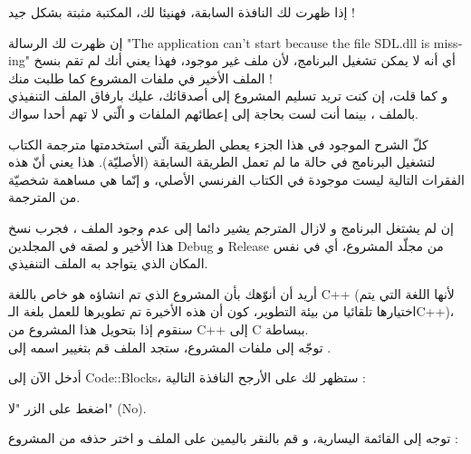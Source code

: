 
إذا ظهرت لك النافذة السابقة، فهنيئا لك، المكتبة مثبتة بشكل جيد !

\begin{information}
إن ظهرت لك الرسالة 
"\textenglish{The application can't start because the file SDL.dll is missing}"
أي أنه لا يمكن تشغيل البرنامج، لأن ملف 
غير موجود، فهذا يعني أنك لم تقم بنسخ الملف الأخير في ملفات المشروع كما طلبت منك !\\
و كما قلت، إن كنت تريد تسليم المشروع إلى أصدقائك، عليك بارفاق الملف التنفيذي 
بالملف 
،
بينما أنت لست بحاجة إلى إعطائهم الملفات 
و
الّتي لا تهم أحدا سواك.
\end{information}

\begin{tcolorbox}[breakable,title=ملاحظات مترجمة الكتاب,colback=orange!20,colframe=orange!70,fontupper=\footnotesize,coltitle=white,fonttitle=\large]
كلّ الشرح الموجود في هذا الجزء يعطي الطريقة الّتي استخدمتها مترجمة الكتاب لتشغيل البرنامج في حالة ما لم تعمل الطريقة السابقة (الأصليّة). هذا يعني أنّ هذه الفقرات التالية ليست موجودة في الكتاب الفرنسي الأصلي، و إنّما هي مساهمة شخصيّة من المترجمة.
\tcblower

إن لم يشتغل البرنامج و لازال المترجم يشير دائما إلى عدم وجود الملف 
،
فجرب نسخ هذا الأخير و لصقه في المجلدين 
\textenglish{Debug}
و 
\textenglish{Release}
من مجلّد المشروع، أي في نفس المكان الذي يتواجد به الملف التنفيذي.

أريد أن أنوّهك بأن المشروع الذي تم انشاؤه هو خاص باللغة 
\textenglish{C++}
(لأنها اللغة التي يتم اختيارها تلقائيا من بيئة التطوير، كون أن هذه الأخيرة تم تطويرها للعمل بلغة الـ\textenglish{C++})،
سنقوم إذا بتحويل هذا المشروع من
\textenglish{C++}
إلى 
\textenglish{C}
ببساطة.\\
توجّه إلى ملفات المشروع، ستجد الملف
قم بتغيير اسمه إلى
.


أدخل الآن إلى
\textenglish{Code::Blocks}،
ستظهر لك على الأرجح النافذة التالية :


اضغط على الزر "لا"
(\textenglish{No}).

توجه إلى القائمة اليسارية، و قم بالنقر باليمين على الملف
و اختر حذفه من المشروع :



\end{tcolorbox}
